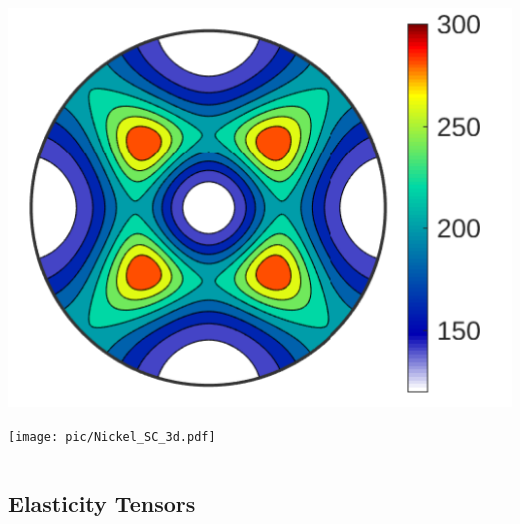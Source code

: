\documentclass[compress]{beamer}
\begin{document}
\begin{frame}[fragile]
\begin{columns}
    \begin{column}{0.35\textwidth}
      \includegraphics[width=\textwidth]{pic/Nickel_SC_2d.pdf}

      \texttt{[image: pic/Nickel\_SC\_3d.pdf]}
    \end{column}
  \end{columns}

\end{frame}



\subsection*{Elasticity Tensors}
\end{document}
